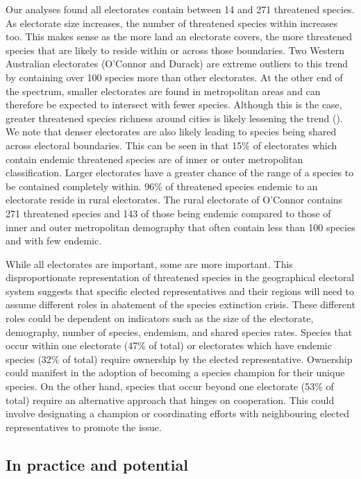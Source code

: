 \documentclass[a4paper,11pt]{article}
\begin{document}
Our analyses found all electorates contain between 14 and 271 threatened species. As electorate size increases, the number of threatened species within increases too. This makes sense as the more land an electorate covers, the more threatened species that are likely to reside within or across those boundaries. Two Western Australian electorates (O'Connor and Durack) are extreme outliers to this trend by containing over 100 species more than other electorates. At the other end of the spectrum, smaller electorates are found in metropolitan areas and can therefore be expected to intersect with fewer species. Although this is the case, greater threatened species richness around cities is likely lessening the trend (\cite{ivesCitiesAreHotspots2016,schwartzConservationDisenfranchisedUrban2002}). We note that denser electorates are also likely leading to species being shared across electoral boundaries. This can be seen in that 15\% of electorates which contain endemic threatened species are of inner or outer metropolitan classification. Larger electorates have a greater chance of the range of a species to be contained completely within. 96\% of threatened species endemic to an electorate reside in rural electorates. The rural electorate of O'Connor contains 271 threatened species and 143 of those being endemic compared to those of inner and outer metropolitan demography that often contain less than 100 species and with few endemic.

While all electorates are important, some are more important. This disproportionate representation of threatened species in the geographical electoral system suggests that specific elected representatives and their regions will need to assume different roles in abatement of the species extinction crisis. These different roles could be dependent on indicators such as the size of the electorate, demography, number of species, endemism, and shared species rates. Species that occur within one electorate (47\% of total) or electorates which have endemic species (32\% of total) require ownership by the elected representative. Ownership could manifest in the adoption of becoming a species champion for their unique species. On the other hand, species that occur beyond one electorate (53\% of total) require an alternative approach that hinges on cooperation. This could involve designating a champion or coordinating efforts with neighbouring elected representatives to promote the issue.

\subsection{In practice and potential}
\end{document}
